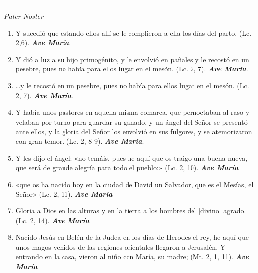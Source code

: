 \documentclass[a4paper,11pt, oneside]{report}
\begin{document}
{{    \medskip

    \begin{center}\rule{1\linewidth}{\linethickness}\end{center}

    \medskip
    \textit{Pater Noster} 

    \begin{enumerate}
      \item Y sucedió que estando ellos allí se le complieron a ella los días del parto. (Lc. 2,6). \textbf{\textit{Ave María}}.

      \item Y dió a luz a su hijo primogénito, y le envolvió en pañales y le recostó en un pesebre, pues no había para ellos lugar en el mesón.  
      (Lc. 2, 7). \textbf{\textit{Ave María}}.

      \item \ldots y le recostó en un pesebre, pues no había para ellos lugar en el mesón. (Lc. 2, 7). \textbf{\textit{Ave María}}.

      \item Y había unos pastores en aquella misma comarca, que pernoctaban al raso y velaban por turno para guardar su ganado, y un ángel
      del Señor se presentó ante ellos, y la gloria del Señor los envolvió en sus fulgores, y se atemorizaron con gran temor. (Lc. 2, 8-9). \textbf{\textit{Ave María}}.

      \item Y les dijo el ángel: «no temáis, pues he aquí que os traigo una buena nueva, que será de grande alegría para todo el pueblo:» (Lc. 2, 10). \textbf{\textit{Ave María}}

      \item «que os ha nacido hoy en la ciudad de David un Salvador, que es el Mesías, el Señor» (Lc. 2, 11). \textbf{\textit{Ave María}}

      \item Gloria a Dios en las alturas y en la tierra a los hombres del [divino] agrado. (Lc. 2, 14). \textbf{\textit{Ave María}}

      \item Nacido Jesús en Belén de la Judea en los días de Herodes el rey, he aquí que unos magos venidos de las regiones orientales llegaron a Jerusalén.
      Y entrando en la casa, vieron al niño con María, su madre; (Mt. 2, 1, 11). \textbf{\textit{Ave María}}


\end{enumerate}}}
\end{document}
